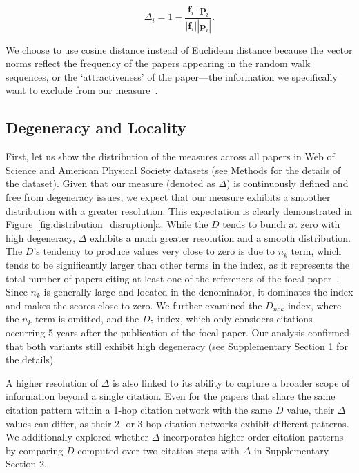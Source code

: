 \documentclass[12pt]{article}
\begin{document}
\begin{equation}
\Delta_i =1-\frac{\mathbf{f}_i\cdot \mathbf{p}_i}{| \mathbf{f}_i| |\mathbf{p}_i|}.
\end{equation}

We choose to use cosine distance instead of Euclidean distance because the vector norms reflect the frequency of the papers appearing in the random walk sequences, or the `attractiveness' of the paper---the information we specifically want to exclude from our measure~\cite{murray2020unsupervised,schakel2015measuring}.





\subsection{Degeneracy and Locality}




First, let us show the distribution of the measures across all papers in Web of Science and American Physical Society datasets (see Methods for the details of the dataset).
Given that our measure (denoted as $\Delta$) is continuously defined and free from degeneracy issues, we expect that our measure exhibits a smoother distribution with a greater resolution. This expectation is clearly demonstrated in Figure~\ref{fig:distribution_disruption}a. While the $D$ tends to bunch at zero with high degeneracy, $\Delta$ exhibits a much greater resolution and a smooth distribution. The $D$'s tendency to produce values very close to zero is due to $n_k$ term, which tends to be significantly larger than other terms in the index, as it represents the total number of papers citing at least one of the references of the focal paper~\cite{bornmann2020disruption}. Since $n_k$ is generally large and located in the denominator, it dominates the index and makes the scores close to zero. We further examined the $D_{nok}$ index, where the $n_k$ term is omitted, and the $D_5$ index, which only considers citations occurring 5 years after the publication of the focal paper. Our analysis confirmed that both variants still exhibit high degeneracy (see Supplementary Section 1 for the details). 


A higher resolution of $\Delta$ is also linked to its ability to capture a broader scope of information beyond a single citation. Even for the papers that share the same citation pattern within a 1-hop citation network with the same $D$ value, their $\Delta$ values can differ, as their 2- or 3-hop citation networks exhibit different patterns. We additionally explored whether $\Delta$ incorporates higher-order citation patterns by comparing $D$ computed over two citation steps with $\Delta$ in Supplementary Section 2. 
\end{document}
